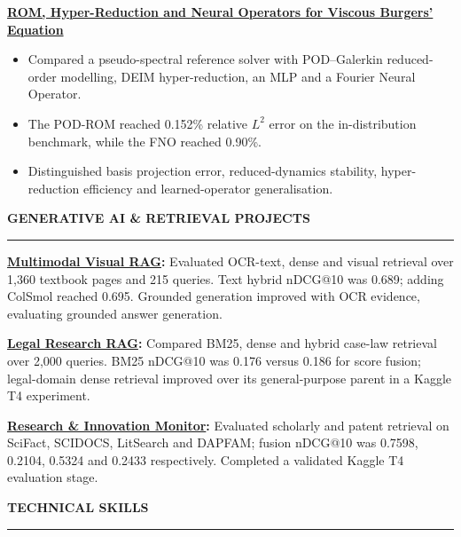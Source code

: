 \documentclass[10pt,a4paper]{article}
\newcommand{\cvsec}[1]{%
  \needspace{5\baselineskip}%
  \vspace{3pt}
  {\color{accent}\bfseries\uppercase{#1}}\\[-3pt]
  {\color{accent}\rule{\linewidth}{0.5pt}}%
  \vspace{4pt}%
}
\newenvironment{cvitems}{%
  \begin{itemize}[leftmargin=1.1em, itemsep=1pt, topsep=2pt, parsep=0pt, label=\textbullet, beginpenalty=10000]
}{%
  \end{itemize}%
}
\begin{document}
\noindent\textbf{\href{https://github.com/AdebanjiAdelowo/neural-surrogate-burgers}{ROM, Hyper-Reduction and Neural Operators for Viscous Burgers' Equation}}
\begin{cvitems}
  \item Compared a pseudo-spectral reference solver with POD--Galerkin reduced-order modelling, DEIM hyper-reduction, an MLP and a Fourier Neural Operator.
  \item The POD-ROM reached 0.152\% relative $L^2$ error on the in-distribution benchmark, while the FNO reached 0.90\%.
  \item Distinguished basis projection error, reduced-dynamics stability, hyper-reduction efficiency and learned-operator generalisation.
\end{cvitems}


\cvsec{Generative AI \& Retrieval Projects}
\noindent\textbf{\href{https://github.com/AdebanjiAdelowo/multimodal-visual-rag}{Multimodal Visual RAG}:} Evaluated OCR-text, dense and visual retrieval over 1,360 textbook pages and 215 queries. Text hybrid nDCG@10 was 0.689; adding ColSmol reached 0.695. Grounded generation improved with OCR evidence, evaluating grounded answer generation.

\noindent\textbf{\href{https://github.com/AdebanjiAdelowo/legal-research-rag}{Legal Research RAG}:} Compared BM25, dense and hybrid case-law retrieval over 2,000 queries. BM25 nDCG@10 was 0.176 versus 0.186 for score fusion; legal-domain dense retrieval improved over its general-purpose parent in a Kaggle T4 experiment.

\noindent\textbf{\href{https://github.com/AdebanjiAdelowo/research-innovation-monitor}{Research \& Innovation Monitor}:} Evaluated scholarly and patent retrieval on SciFact, SCIDOCS, LitSearch and DAPFAM; fusion nDCG@10 was 0.7598, 0.2104, 0.5324 and 0.2433 respectively. Completed a validated Kaggle T4 evaluation stage.



\cvsec{Technical Skills}
\end{document}
